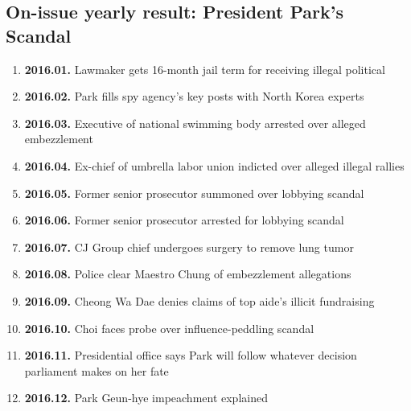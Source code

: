 \subsection{On-issue yearly result: President Park's Scandal}
\begin{enumerate}
  \item \textbf{2016.01.} Lawmaker gets 16-month jail term for receiving illegal political
  \item \textbf{2016.02.} Park fills spy agency's key posts with North Korea experts
  \item \textbf{2016.03.} Executive of national swimming body arrested over alleged embezzlement
  \item \textbf{2016.04.} Ex-chief of umbrella labor union indicted over alleged illegal rallies
  \item \textbf{2016.05.} Former senior prosecutor summoned over lobbying scandal
  \item \textbf{2016.06.} Former senior prosecutor arrested for lobbying scandal
  \item \textbf{2016.07.} CJ Group chief undergoes surgery to remove lung tumor
  \item \textbf{2016.08.} Police clear Maestro Chung of embezzlement allegations
  \item \textbf{2016.09.} Cheong Wa Dae denies claims of top aide's illicit fundraising
  \item \textbf{2016.10.} Choi faces probe over influence-peddling scandal
  \item \textbf{2016.11.} Presidential office says Park will follow whatever decision parliament makes on her fate
  \item \textbf{2016.12.} Park Geun-hye impeachment explained
\end{enumerate}